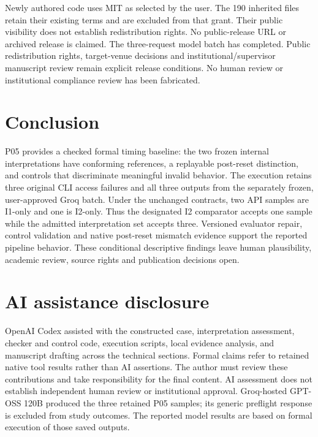 \documentclass[11pt,a4paper]{article}
\begin{document}
Newly authored code uses MIT as selected by the user. The 190 inherited files retain their existing terms and are excluded from that grant. Their public visibility does not establish redistribution rights. No public-release URL or archived release is claimed. The three-request model batch has completed. Public redistribution rights, target-venue decisions and institutional/supervisor manuscript review remain explicit release conditions. No human review or institutional compliance review has been fabricated.

\section{Conclusion}
P05 provides a checked formal timing baseline: the two frozen internal interpretations have conforming references, a replayable post-reset distinction, and controls that discriminate meaningful invalid behavior. The execution retains three original CLI access failures and all three outputs from the separately frozen, user-approved Groq batch. Under the unchanged contracts, two API samples are I1-only and one is I2-only. Thus the designated I2 comparator accepts one sample while the admitted interpretation set accepts three. Versioned evaluator repair, control validation and native post-reset mismatch evidence support the reported pipeline behavior. These conditional descriptive findings leave human plausibility, academic review, source rights and publication decisions open.

\section*{AI assistance disclosure}
OpenAI Codex assisted with the constructed case, interpretation assessment, checker and control code, execution scripts, local evidence analysis, and manuscript drafting across the technical sections. Formal claims refer to retained native tool results rather than AI assertions. The author must review these contributions and take responsibility for the final content. AI assessment does not establish independent human review or institutional approval. Groq-hosted GPT-OSS 120B produced the three retained P05 samples; its generic preflight response is excluded from study outcomes. The reported model results are based on formal execution of those saved outputs.



\end{document}
